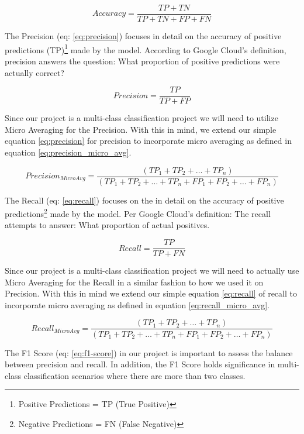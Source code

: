 \documentclass[11pt]{article}
\begin{document}
\begin{equation}
Accuracy = \frac{TP+TN}{TP+TN+FP+FN}
\label{eq:accuracy}
\end{equation}

The Precision (eq: \ref{eq:precision}) focuses in detail on the accuracy of positive predictions (TP)\footnote{Positive Predictions = TP (True Positive)} made by the model. According to Google Cloud's definition, precision answers the question: What proportion of positive predictions were actually correct?

\begin{equation}
Precision = \frac{TP}{TP+FP}
\label{eq:precision}
\end{equation}

Since our project is a multi-class classification project we will need to utilize Micro Averaging for the Precision. With this in mind, we extend our simple equation \ref{eq:precision} for precision to incorporate micro averaging as defined in equation 
\ref{eq:precision_micro_avg}.

\begin{equation}
Precision_{MicroAvg} = \frac{(TP_1 + TP_2 + \ldots + TP_n)}{(TP_1 + TP_2 + \ldots + TP_n + FP_1 + FP_2 + \ldots + FP_n)}
\label{eq:precision_micro_avg}
\end{equation}

The Recall (eq: \ref{eq:recall}) focuses on the in detail on the accuracy of positive predictions\footnote{Negative Predictions = FN (False Negative)} made by the model. Per Google Cloud's definition: The recall attempts to answer: What proportion of actual positives.

\begin{equation}
Recall = \frac{TP}{TP+FN}
\label{eq:recall}
\end{equation}

Since our project is a multi-class classification project we will need to actually use Micro Averaging for the Recall in a similar fashion to how we used it on Precision. With this in mind we extend our simple equation \ref{eq:recall} of recall to incorporate micro averaging as defined in equation \ref{eq:recall_micro_avg}.

\begin{equation}
Recall_{MicroAvg} = \frac{(TP_1 + TP_2 + \ldots + TP_n)}{(TP_1 + TP_2 + \ldots + TP_n + FP_1 + FP_2 + \ldots + FP_n)}
\label{eq:recall_micro_avg}
\end{equation}

The F1 Score (eq: \ref{eq:f1-score}) in our project is important to assess the balance between precision and recall. In addition, the F1 Score holds significance in multi-class classification scenarios where there are more than two classes.
\end{document}
